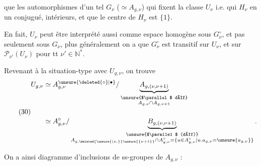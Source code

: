 que les automorphismes d'un tel $G_\nu$ ($\simeq A_{g,\nu}$) qui fixent la classe $U_\nu$ i.e. qui  $H_\nu$ en un conjugué,  intérieurs, et que le centre de $H_\nu$ est $\{1\}$.

En fait, $U_\nu$ peut être interprété aussi comme espace homogène sous $G_\nu^\circ$, et pas seulement sous $G_\nu$, plus généralement on a que $G_\nu^\circ$ est transitif sur $U_\nu$, et  sur $\mathcal P_{\nu'}(U_\nu)$ pour tt $\nu'\in\mathbb N^*$.

Revenant à la situation-type avec $U_{g,\nu}$, on trouve
\[
\tag{30}
\begin{aligned}
U_{g,\nu}
&\simeq A_{g,\nu}^{\unsure{\deleted{\circ}|\bullet}}/
\underbrace{A_{g,(\nu,\nu+1)}}_{\substack{\text{\unsure{$\parallel$ déf}}\\ A_{g,\nu}\cap A_{g,\nu+1}}}\\[1.2em]
&\simeq A_{g,\nu}^{\circ}/
\underbrace{B_{g,(\nu,\nu+1)}}_{\substack{\text{\unsure{$\parallel$ (déf)}}\\
 A_{g,\deleted{\unsure{(\nu,}}\unsure{\{\nu+1\}}}\cap A_{g,\nu}^{\circ}
 =\{u\in A_{g,\nu}^{\circ}\mid u.a_{g,\nu}=\unsure{a_{g,\nu}}\}}}.
\end{aligned}
\]

On a ainsi    diagramme d'inclusions de ss-groupes de $A_{g,\nu}$ :

